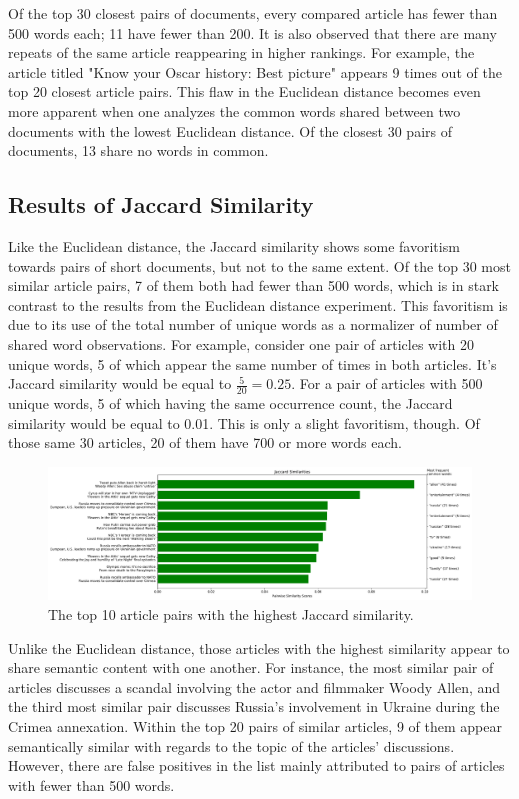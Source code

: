 \documentclass[11pt]{article}
\begin{document}
Of the top 30 closest pairs of documents, every compared article has fewer than 500 words each; 11 have fewer than 200.
It is also observed that there are many repeats of the same article reappearing in higher rankings.
For example, the article titled "Know your Oscar history: Best picture" appears 9 times out of the top 20 closest article pairs.
This flaw in the Euclidean distance becomes even more apparent when one analyzes the common words shared between two documents with the lowest Euclidean distance.
Of the closest 30 pairs of documents, 13 share no words in common.

\subsection{Results of Jaccard Similarity}

Like the Euclidean distance, the Jaccard similarity shows some favoritism towards pairs of short documents, but not to the same extent.
Of the top 30 most similar article pairs, 7 of them both had fewer than 500 words, which is in stark contrast to the results from the Euclidean distance experiment.
This favoritism is due to its use of the total number of unique words as a normalizer of number of shared word observations.
For example, consider one pair of articles with 20 unique words, 5 of which appear the same number of times in both articles.
It's Jaccard similarity would be equal to $\frac{5}{20} = 0.25$.
For a pair of articles with 500 unique words, 5 of which having the same occurrence count, the Jaccard similarity would be equal to 0.01.
This is only a slight favoritism, though.
Of those same 30 articles, 20 of them have 700 or more words each.

\begin{figure}[h] \label{fig:jaccard}
  \centering
  \includegraphics[width=\textwidth]{figures/jaccard_most_sim}
  \caption{The top 10 article pairs with the highest Jaccard similarity.}
\end{figure}

Unlike the Euclidean distance, those articles with the highest similarity appear to share semantic content with one another.
For instance, the most similar pair of articles discusses a scandal involving the actor and filmmaker Woody Allen, and the third most similar pair discusses Russia's involvement in Ukraine during the Crimea annexation.
Within the top 20 pairs of similar articles, 9 of them appear semantically similar with regards to the topic of the articles' discussions.
However, there are false positives in the list mainly attributed to pairs of articles with fewer than 500 words.
\end{document}
